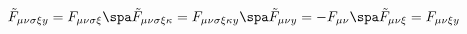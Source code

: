 \begin{equation}
\tilde{F}_{\mu \nu \sigma \xi y} = F_{\mu \nu \sigma \xi}
\spa
\tilde{F}_{\mu \nu \sigma \xi \kappa} = F_{\mu \nu \sigma \xi \kappa y}
\spa
\tilde{F}_{\mu \nu y} = - F_{\mu \nu}
\spa
\tilde{F}_{\mu \nu \xi} = F_{\mu \nu \xi y}
\end{equation}

